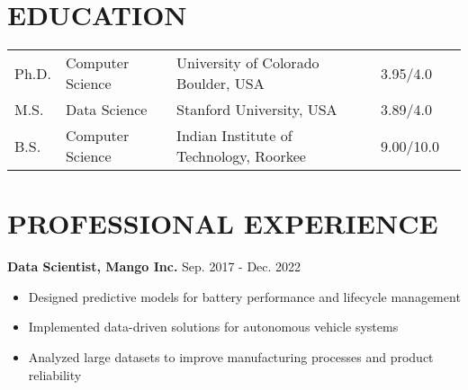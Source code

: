 \documentclass[a4paper,11pt]{article}
\begin{document}
\maketitle

\vspace{0.3em}

\section{EDUCATION}
\begingroup
\setlength{\tabcolsep}{12pt}
\begin{tabularx}{\textwidth}{@{}llll>{\raggedleft\arraybackslash}X@{}}
Ph.D. & Computer Science & University of Colorado Boulder, USA & 3.95/4.0 & 2022 \\
M.S. & Data Science & Stanford University, USA & 3.89/4.0 & 2017 \\
B.S. & Computer Science & Indian Institute of Technology, Roorkee & 9.00/10.0 & 2005
\end{tabularx}
\endgroup

\section{\uppercase{Professional Experience}}



\textbf{Data Scientist, Mango Inc.} \hfill Sep. 2017 - Dec. 2022
\vspace{-0.3em}
\begin{itemize}[noitemsep]
    \item[\faChevronRight] Designed predictive models for battery performance and lifecycle management
    \item[\faChevronRight] Implemented data-driven solutions for autonomous vehicle systems
    \item[\faChevronRight] Analyzed large datasets to improve manufacturing processes and product reliability
\end{itemize}
\end{document}
